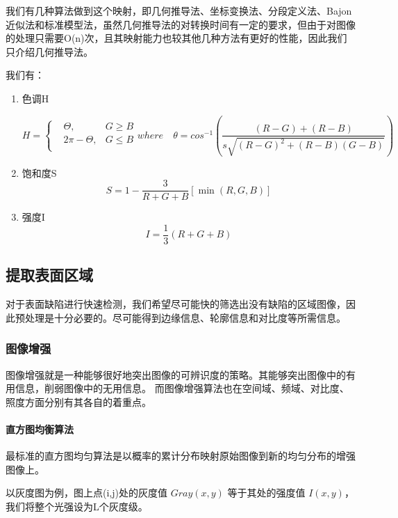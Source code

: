 我们有几种算法做到这个映射，即几何推导法、坐标变换法、分段定义法、Bajon近似法和标准模型法，虽然几何推导法的对转换时间有一定的要求，但由于对图像的处理只需要O(n)次，且其映射能力也较其他几种方法有更好的性能，因此我们只介绍几何推导法。

我们有：

\begin{enumerate}
\item 色调H

\begin{equation}
	\label{}
	H =\left\{
		\begin{aligned}
		& \Theta, & G \geq B \\
		& 2 \pi - \Theta, & G \le B \\
		\end{aligned}
		\right.
	where \quad \theta = cos^{-1}(\frac{(R-G)+(R-B)}{s\sqrt{(R-G)^{2}+(R-B)(G-B)}})
\end{equation}

\item 饱和度S
\begin{equation}
	S = 1 - \frac{3}{R+G+B} [\min(R,G,B)]
\end{equation}

\item 强度I
\begin{equation}
	I = \frac{1}{3}(R+G+B)
\end{equation}
\end{enumerate}

\subsection{提取表面区域}
对于表面缺陷进行快速检测，我们希望尽可能快的筛选出没有缺陷的区域图像，因此预处理是十分必要的。尽可能得到边缘信息、轮廓信息和对比度等所需信息。
\subsubsection{图像增强}
图像增强就是一种能够很好地突出图像的可辨识度的策略。其能够突出图像中的有用信息，削弱图像中的无用信息。
而图像增强算法也在空间域、频域、对比度、照度方面分别有其各自的着重点。
\paragraph{直方图均衡算法}
最标准的直方图均匀算法是以概率的累计分布映射原始图像到新的均匀分布的增强图像上。

以灰度图为例，图上点(i,j)处的灰度值 $ Gray(x,y) $ 等于其处的强度值 $ I(x,y) $， 我们将整个光强设为L个灰度级。

